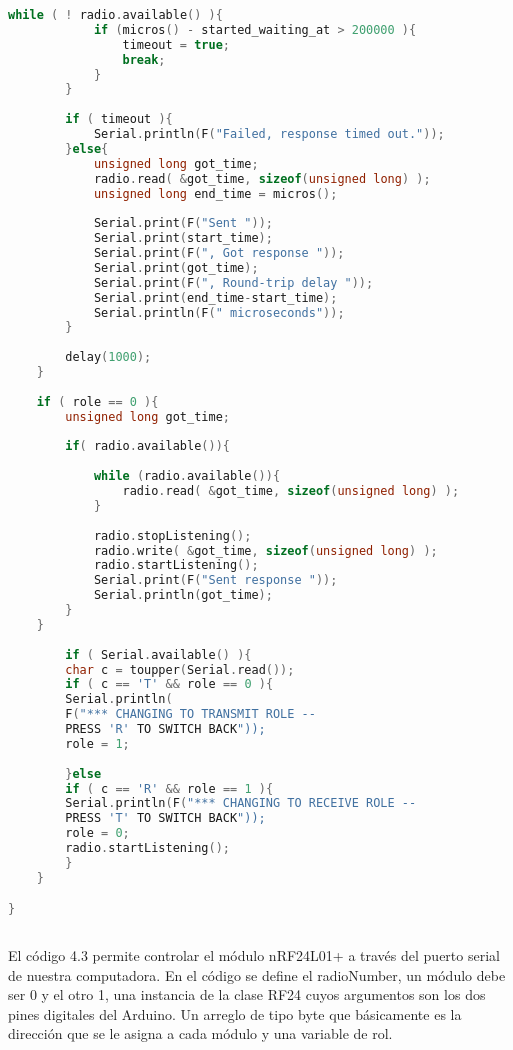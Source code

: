 \begin{lstlisting}[language=C++, caption={Codigo Ejemplo para módulo nRF24L01+}, captionpos=b]
		while ( ! radio.available() ){                            
			if (micros() - started_waiting_at > 200000 ){           
				timeout = true;
				break;
			}
		}
		
		if ( timeout ){                                           
			Serial.println(F("Failed, response timed out."));
		}else{
			unsigned long got_time;                               
			radio.read( &got_time, sizeof(unsigned long) );
			unsigned long end_time = micros();
			
			Serial.print(F("Sent "));
			Serial.print(start_time);
			Serial.print(F(", Got response "));
			Serial.print(got_time);
			Serial.print(F(", Round-trip delay "));
			Serial.print(end_time-start_time);
			Serial.println(F(" microseconds"));
		}
		
		delay(1000);
	}
	
	if ( role == 0 ){
		unsigned long got_time;
		
		if( radio.available()){
		
			while (radio.available()){                                  
				radio.read( &got_time, sizeof(unsigned long) );            
			}
			
			radio.stopListening();                                       
			radio.write( &got_time, sizeof(unsigned long) );             
			radio.startListening();                                      
			Serial.print(F("Sent response "));
			Serial.println(got_time);
		}
	}
		
		if ( Serial.available() ){
		char c = toupper(Serial.read());
		if ( c == 'T' && role == 0 ){
		Serial.println(
		F("*** CHANGING TO TRANSMIT ROLE -- 
		PRESS 'R' TO SWITCH BACK"));
		role = 1;                 
		
		}else
		if ( c == 'R' && role == 1 ){
		Serial.println(F("*** CHANGING TO RECEIVE ROLE -- 
		PRESS 'T' TO SWITCH BACK"));
		role = 0;                
		radio.startListening();
		}
	}

} 
	
\end{lstlisting}

\par \noindent
El código 4.3 permite controlar el módulo nRF24L01+ a través del puerto serial de nuestra computadora. En el código se define el radioNumber, un módulo debe ser 0 y el otro 1, una instancia de la clase RF24 cuyos argumentos son los dos pines digitales del Arduino. Un arreglo de tipo byte que básicamente es la dirección que se le asigna a cada módulo y una variable de rol. 

